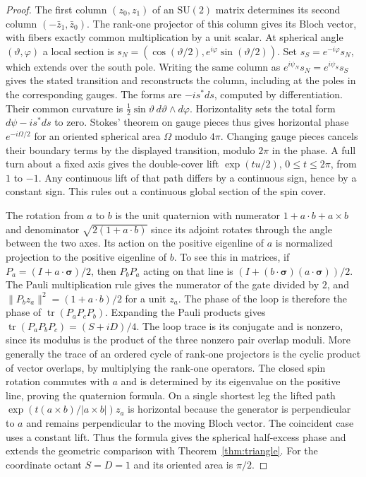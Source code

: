 \documentclass[11pt,reqno]{amsart}
\theoremstyle{definition}
\theoremstyle{remark}
\numberwithin{equation}{section}
\newcommand{\SU}{\mathrm{SU}}
\begin{document}
\begin{proof}
The first column $(z_0,z_1)$ of an $\SU(2)$ matrix determines its second column $(-\bar z_1,\bar z_0)$. The rank-one projector of this column gives its Bloch vector, with fibers exactly common multiplication by a unit scalar. At spherical angle $(\vartheta,\varphi)$ a local section is $s_N=(\cos(\vartheta/2),e^{i\varphi}\sin(\vartheta/2))$. Set $s_S=e^{-i\varphi}s_N$, which extends over the south pole. Writing the same column as $e^{i\psi_N}s_N=e^{i\psi_S}s_S$ gives the stated transition and reconstructs the column, including at the poles in the corresponding gauges. The forms are $-i s^*ds$, computed by differentiation. Their common curvature is $\frac12\sin\vartheta\,d\vartheta\wedge d\varphi$. Horizontality sets the total form $d\psi-i s^*ds$ to zero. Stokes' theorem on gauge pieces thus gives horizontal phase $e^{-i\Omega/2}$ for an oriented spherical area $\Omega$ modulo $4\pi$. Changing gauge pieces cancels their boundary terms by the displayed transition, modulo $2\pi$ in the phase. A full turn about a fixed axis gives the double-cover lift $\exp(tu/2)$, $0\le t\le2\pi$, from $1$ to $-1$. Any continuous lift of that path differs by a continuous sign, hence by a constant sign. This rules out a continuous global section of the spin cover.

The rotation from $a$ to $b$ is the unit quaternion with numerator $1+a\cdot b+a\times b$ and denominator $\sqrt{2(1+a\cdot b)}$ since its adjoint rotates through the angle between the two axes. Its action on the positive eigenline of $a$ is normalized projection to the positive eigenline of $b$. To see this in matrices, if $P_a=(I+a\cdot\boldsymbol{\sigma})/2$, then $P_bP_a$ acting on that line is $(I+(b\cdot\boldsymbol{\sigma})(a\cdot\boldsymbol{\sigma}))/2$. The Pauli multiplication rule gives the numerator of the gate divided by $2$, and $\|P_b z_a\|^2=(1+a\cdot b)/2$ for a unit $z_a$. The phase of the loop is therefore the phase of $\operatorname{tr}(P_aP_cP_b)$. Expanding the Pauli products gives $\operatorname{tr}(P_aP_bP_c)=(S+iD)/4$. The loop trace is its conjugate and is nonzero, since its modulus is the product of the three nonzero pair overlap moduli. More generally the trace of an ordered cycle of rank-one projectors is the cyclic product of vector overlaps, by multiplying the rank-one operators. The closed spin rotation commutes with $a$ and is determined by its eigenvalue on the positive line, proving the quaternion formula. On a single shortest leg the lifted path $\exp(t(a\times b)/|a\times b|)z_a$ is horizontal because the generator is perpendicular to $a$ and remains perpendicular to the moving Bloch vector. The coincident case uses a constant lift. Thus the formula gives the spherical half-excess phase and extends the geometric comparison with Theorem~\ref{thm:triangle}. For the coordinate octant $S=D=1$ and its oriented area is $\pi/2$.
\end{proof}
\end{document}
